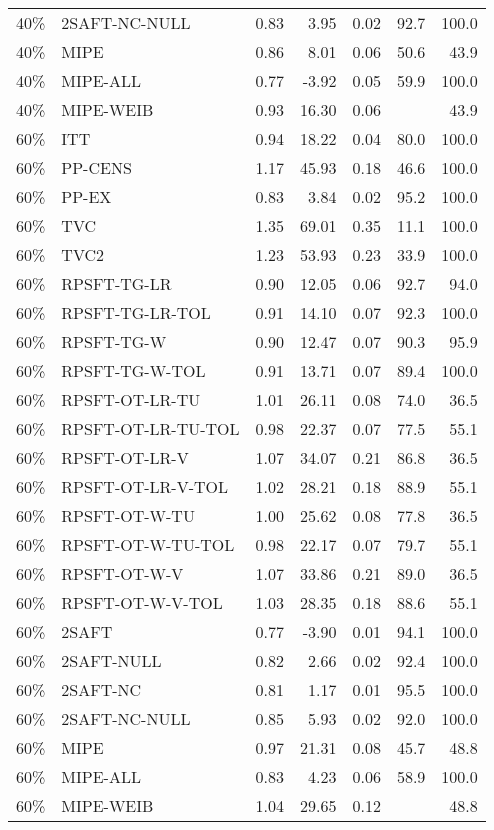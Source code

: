 \begin{table}[ht]
{\begin{tabular}{llrrrrr}
  40\% & 2SAFT-NC-NULL & 0.83 & 3.95 & 0.02 & 92.7 & 100.0 \\ 
  40\% & MIPE & 0.86 & 8.01 & 0.06 & 50.6 & 43.9 \\ 
  40\% & MIPE-ALL & 0.77 & -3.92 & 0.05 & 59.9 & 100.0 \\ 
  40\% & MIPE-WEIB & 0.93 & 16.30 & 0.06 &  & 43.9 \\ 
   \hline
60\% & ITT & 0.94 & 18.22 & 0.04 & 80.0 & 100.0 \\ 
  60\% & PP-CENS & 1.17 & 45.93 & 0.18 & 46.6 & 100.0 \\ 
  60\% & PP-EX & 0.83 & 3.84 & 0.02 & 95.2 & 100.0 \\ 
  60\% & TVC & 1.35 & 69.01 & 0.35 & 11.1 & 100.0 \\ 
  60\% & TVC2 & 1.23 & 53.93 & 0.23 & 33.9 & 100.0 \\ 
   \hline
60\% & RPSFT-TG-LR & 0.90 & 12.05 & 0.06 & 92.7 & 94.0 \\ 
  60\% & RPSFT-TG-LR-TOL & 0.91 & 14.10 & 0.07 & 92.3 & 100.0 \\ 
  60\% & RPSFT-TG-W & 0.90 & 12.47 & 0.07 & 90.3 & 95.9 \\ 
  60\% & RPSFT-TG-W-TOL & 0.91 & 13.71 & 0.07 & 89.4 & 100.0 \\ 
  60\% & RPSFT-OT-LR-TU & 1.01 & 26.11 & 0.08 & 74.0 & 36.5 \\ 
  60\% & RPSFT-OT-LR-TU-TOL & 0.98 & 22.37 & 0.07 & 77.5 & 55.1 \\ 
  60\% & RPSFT-OT-LR-V & 1.07 & 34.07 & 0.21 & 86.8 & 36.5 \\ 
  60\% & RPSFT-OT-LR-V-TOL & 1.02 & 28.21 & 0.18 & 88.9 & 55.1 \\ 
   \hline
60\% & RPSFT-OT-W-TU & 1.00 & 25.62 & 0.08 & 77.8 & 36.5 \\ 
  60\% & RPSFT-OT-W-TU-TOL & 0.98 & 22.17 & 0.07 & 79.7 & 55.1 \\ 
  60\% & RPSFT-OT-W-V & 1.07 & 33.86 & 0.21 & 89.0 & 36.5 \\ 
  60\% & RPSFT-OT-W-V-TOL & 1.03 & 28.35 & 0.18 & 88.6 & 55.1 \\ 
   \hline
60\% & 2SAFT & 0.77 & -3.90 & 0.01 & 94.1 & 100.0 \\ 
  60\% & 2SAFT-NULL & 0.82 & 2.66 & 0.02 & 92.4 & 100.0 \\ 
  60\% & 2SAFT-NC & 0.81 & 1.17 & 0.01 & 95.5 & 100.0 \\ 
  60\% & 2SAFT-NC-NULL & 0.85 & 5.93 & 0.02 & 92.0 & 100.0 \\ 
  60\% & MIPE & 0.97 & 21.31 & 0.08 & 45.7 & 48.8 \\ 
  60\% & MIPE-ALL & 0.83 & 4.23 & 0.06 & 58.9 & 100.0 \\ 
  60\% & MIPE-WEIB & 1.04 & 29.65 & 0.12 &  & 48.8 \\ 
   \hline
\end{tabular}
}
\end{table}
